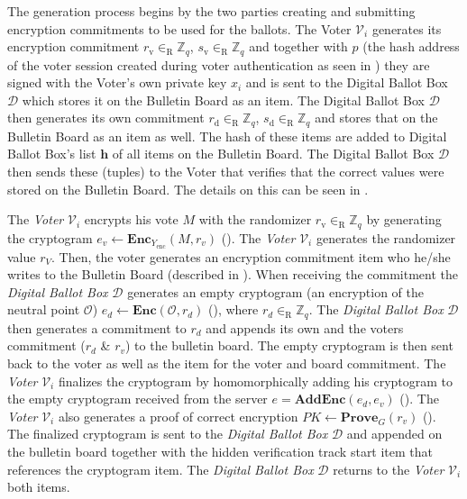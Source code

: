 The generation process begins by the two parties creating and submitting encryption commitments to be used for the ballots. The Voter $\mathcal{V}_i$ generates its encryption commitment $r_\mathrm{v} \in_\mathrm{R} \mathbb{Z}_q$, $s_\mathrm{v} \in_\mathrm{R} \mathbb{Z}_q$ and together with $p$ (the hash address of the voter session created during voter authentication as seen in ) they are signed with the Voter's own private key $x_i$ and is sent to the Digital Ballot Box $\mathcal{D}$ which stores it on the Bulletin Board as an item. The Digital Ballot Box $\mathcal{D}$ then generates its own commitment $r_\mathrm{d} \in_\mathrm{R} \mathbb{Z}_q$, $s_\mathrm{d} \in_\mathrm{R} \mathbb{Z}_q$ and stores that on the Bulletin Board as an item as well. The hash of these items are added to Digital Ballot Box's list $\boldsymbol{h}$ of all items on the Bulletin Board. The Digital Ballot Box $\mathcal{D}$ then sends these (tuples) to the Voter that verifies that the correct values were stored on the Bulletin Board. The details on this can be seen in .

The \textit{Voter} $\mathcal{V}_i$ encrypts his vote $M$ with the randomizer \( r_\mathrm{v} \in_\mathrm{R} \mathbb{Z}_q \) by generating the cryptogram \( e_v \gets \mathbf{Enc}_{Y_\mathrm{enc}} (M, r_v) \) (). The \textit{Voter} $\mathcal{V}_i$ generates the randomizer value $r_V$. Then, the voter generates an encryption commitment item who he/she writes to the Bulletin Board (described in ). When receiving the commitment the \textit{Digital Ballot Box} $\mathcal{D}$ generates an empty cryptogram (an encryption of the neutral point $\mathcal{O}$) \( e_d \gets \mathbf{Enc} (\mathcal{O}, r_d) \) (), where \( r_d \in_\mathrm{R} \mathbb{Z}_q \). The \textit{Digital Ballot Box} $\mathcal{D}$ then generates a commitment to $r_d$ and appends its own and the voters commitment ($r_d$ \& $r_v$) to the bulletin board. The empty cryptogram is then sent back to the voter as well as the item for the voter and board commitment. The \textit{Voter} $\mathcal{V}_i$ finalizes the cryptogram by homomorphically adding his cryptogram to the empty cryptogram received from the server \( e = \mathbf{AddEnc}(e_d, e_v) \) (). The \textit{Voter} $\mathcal{V}_i$ also generates a proof of correct encryption \( PK \gets \mathbf{Prove}_G (r_v) \) (). The finalized cryptogram is sent to the \textit{Digital Ballot Box} $\mathcal{D}$ and appended on the bulletin board together with the hidden verification track start item that references the cryptogram item. The \textit{Digital Ballot Box} $\mathcal{D}$ returns to the \textit{Voter} $\mathcal{V}_i$ both items.

